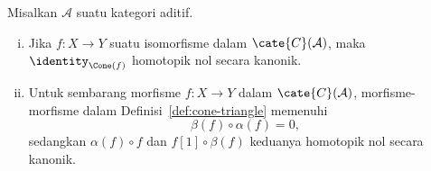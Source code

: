 \begin{proposisi}\label{prop:cone-homotopy}
	Misalkan $\mathcal{A}$ suatu kategori aditif.
	\begin{enumerate}[(i)]
		\item Jika $f:X\to Y$ suatu isomorfisme dalam
		$\cate{C}(\mathcal{A})$, maka $\identity_{\Cone(f)}$ homotopik nol
		secara kanonik.
		\item Untuk sembarang morfisme $f:X\to Y$ dalam
		$\cate{C}(\mathcal{A})$, morfisme-morfisme dalam
		Definisi~\ref{def:cone-triangle} memenuhi
		\[ \beta(f) \circ \alpha(f) = 0, \]
		sedangkan $\alpha(f)\circ f$ dan $f[1]\circ\beta(f)$ keduanya
		homotopik nol secara kanonik.
	\end{enumerate}
\end{proposisi}
